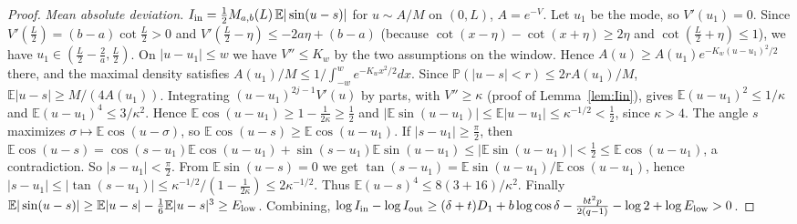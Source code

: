 \documentclass[11pt]{amsart}
\theoremstyle{definition}
\begin{document}
\begin{proof}
\emph{Mean absolute deviation.} $I_{\rm in}=\frac12M_{a,b}(L)\,\mathbb E|\sin(u-s)|$ for $u\sim A/M$ on $(0,L)$, $A=e^{-V}$.
Let $u_1$ be the mode, so $V'(u_1)=0$. Since $V'(\frac L2)=(b-a)\cot\frac L2>0$ and
$V'(\frac L2-\eta)\le-2a\eta+(b-a)$ (because $\cot(x-\eta)-\cot(x+\eta)\ge2\eta$ and $\cot(\frac L2+\eta)\le1$), we have
$u_1\in(\frac L2-\frac2a,\frac L2)$. On $|u-u_1|\le w$ we have $V''\le K_w$ by the two assumptions on the window. Hence
$A(u)\ge A(u_1)e^{-K_w(u-u_1)^2/2}$ there, and the maximal density satisfies $A(u_1)/M\le1/\int_{-w}^we^{-K_wx^2/2}dx$.
Since $\mathbb P(|u-s|<r)\le2rA(u_1)/M$, $\mathbb E|u-s|\ge M/(4A(u_1))$.
Integrating $(u-u_1)^{2j-1}V'(u)$ by parts, with $V''\ge\kappa$ (proof of Lemma~\ref{lem:Iin}), gives $\mathbb E(u-u_1)^2\le1/\kappa$ and
$\mathbb E(u-u_1)^4\le3/\kappa^2$. Hence $\mathbb E\cos(u-u_1)\ge1-\frac1{2\kappa}\ge\frac12$ and $|\mathbb E\sin(u-u_1)|\le\mathbb E|u-u_1|\le\kappa^{-1/2}<\frac12$,
since $\kappa>4$. The angle $s$ maximizes $\sigma\mapsto\mathbb E\cos(u-\sigma)$, so $\mathbb E\cos(u-s)\ge\mathbb E\cos(u-u_1)$. If $|s-u_1|\ge\frac\pi2$, then
$\mathbb E\cos(u-s)=\cos(s-u_1)\mathbb E\cos(u-u_1)+\sin(s-u_1)\mathbb E\sin(u-u_1)\le|\mathbb E\sin(u-u_1)|<\frac12\le\mathbb E\cos(u-u_1)$, a contradiction.
So $|s-u_1|<\frac\pi2$. From $\mathbb E\sin(u-s)=0$ we get $\tan(s-u_1)=\mathbb E\sin(u-u_1)/\mathbb E\cos(u-u_1)$, hence
$|s-u_1|\le|\tan(s-u_1)|\le\kappa^{-1/2}/(1-\frac1{2\kappa})\le2\kappa^{-1/2}$. Thus $\mathbb E(u-s)^4\le8(3+16)/\kappa^2$.
Finally $\mathbb E|\sin(u-s)|\ge\mathbb E|u-s|-\frac16\mathbb E|u-s|^3\ge E_{\rm low}$.
Combining, $\log I_{\rm in}-\log I_{\rm out}\ge(\delta+t)D_1+b\log\cos\delta-\frac{bt^2p}{2(q-1)}-\log2+\log E_{\rm low}>0$.
\end{proof}
\end{document}

